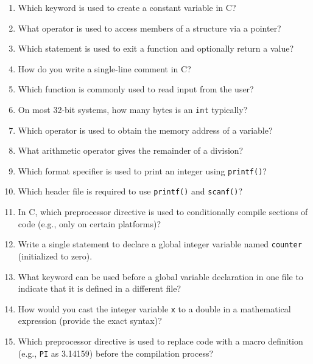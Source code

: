 \documentclass[a4paper,12pt]{article}
\begin{document}
\begin{enumerate}
  \item Which keyword is used to create a constant variable in C?

  \item What operator is used to access members of a structure via a pointer?

  \item Which statement is used to exit a function and optionally return a value?

  \item How do you write a single-line comment in C?

  \item Which function is commonly used to read input from the user?

  \item On most 32-bit systems, how many bytes is an \texttt{int} typically?

  \item Which operator is used to obtain the memory address of a variable?

  \item What arithmetic operator gives the remainder of a division?

  \item Which format specifier is used to print an integer using \texttt{printf()}?

  \item Which header file is required to use \texttt{printf()} and \texttt{scanf()}?

  \item In C, which preprocessor directive is used to conditionally compile sections of code (e.g., only on certain platforms)?

  \item Write a single statement to declare a global integer variable named \texttt{counter} (initialized to zero).

  \item What keyword can be used before a global variable declaration in one file to indicate that it is defined in a different file?

  \item How would you cast the integer variable \texttt{x} to a double in a mathematical expression (provide the exact syntax)?

  \item Which preprocessor directive is used to replace code with a macro definition (e.g., \texttt{PI} as 3.14159) before the compilation process?
\end{enumerate}
\end{document}
